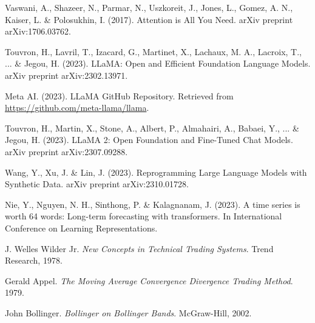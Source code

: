 \begin{thebibliography}{99}
	 Vaswani, A., Shazeer, N., Parmar, N., Uszkoreit, J., Jones, L., Gomez, A. N., Kaiser, L. \& Polosukhin, I. (2017). Attention is All You Need. arXiv preprint arXiv:1706.03762.

	 Touvron, H., Lavril, T., Izacard, G., Martinet, X., Lachaux, M. A., Lacroix, T., ... \& Jegou, H. (2023). LLaMA: Open and Efficient Foundation Language Models. arXiv preprint arXiv:2302.13971.

	 Meta AI. (2023). LLaMA GitHub Repository. Retrieved from \url{https://github.com/meta-llama/llama}.

	 Touvron, H., Martin, X., Stone, A., Albert, P., Almahairi, A., Babaei, Y., ... \& Jegou, H. (2023). LLaMA 2: Open Foundation and Fine-Tuned Chat Models. arXiv preprint arXiv:2307.09288.

	 Wang, Y., Xu, J. \& Lin, J. (2023). Reprogramming Large Language Models with Synthetic Data. arXiv preprint arXiv:2310.01728.

	 Nie, Y., Nguyen, N. H., Sinthong, P. \& Kalagnanam, J. (2023). A time series is worth 64 words: Long-term forecasting with transformers. In International Conference on Learning Representations.

	J. Welles Wilder Jr.
	\textit{New Concepts in Technical Trading Systems}.
	Trend Research, 1978.

	Gerald Appel.
	\textit{The Moving Average Convergence Divergence Trading Method}.
	1979.

	John Bollinger.
	\textit{Bollinger on Bollinger Bands}.
	McGraw-Hill, 2002.
\end{thebibliography}
